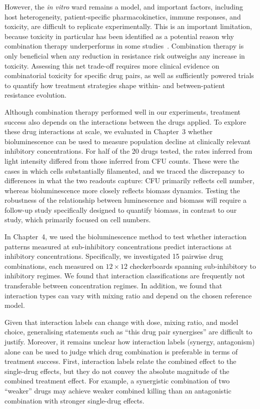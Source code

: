 \documentclass[../main.tex]{subfiles}
\begin{document}
However, the  \textit{in vitro}  ward remains a model, and important factors, including host heterogeneity, patient-specific pharmacokinetics, immune responses, and toxicity, are difficult to replicate experimentally.
This is an important limitation, because toxicity in particular has been identified as a potential reason why combination therapy underperforms in some studies~\cite{Paul2014}.
Combination therapy is only beneficial when any reduction in resistance risk outweighs any increase in toxicity.
Assessing this net trade-off requires more clinical evidence on combinatorial toxicity for specific drug pairs, as well as sufficiently powered trials to quantify how treatment strategies shape within- and between-patient resistance evolution.

Although combination therapy performed well in our experiments, treatment success also depends on the interactions between the drugs applied.
To explore these drug interactions at scale, we evaluated in Chapter~3 whether bioluminescence can be used to measure population decline at clinically relevant inhibitory concentrations.
For half of the 20 drugs tested, the rates inferred from light intensity differed from those inferred from CFU counts.
These were the cases in which cells substantially filamented, and we traced the discrepancy to differences in what the two readouts capture: CFU primarily reflects cell number, whereas bioluminescence more closely reflects biomass dynamics.
Testing the robustness of the relationship between luminescence and biomass will require a follow-up study specifically designed to quantify biomass, in contrast to our study, which primarily focused on cell numbers.

In Chapter~4, we  used the bioluminescence method to test whether interaction patterns measured at sub-inhibitory concentrations predict interactions at inhibitory concentrations.
Specifically, we investigated 15 pairwise drug combinations, each measured on \(12\times 12\) checkerboards spanning sub-inhibitory to inhibitory regimes.
We found that interaction classifications are frequently not transferable between concentration regimes.
In addition, we found that interaction types can vary with mixing ratio and depend on the chosen reference model.

Given that interaction labels can change with dose, mixing ratio, and model choice, generalising statements such as ``this drug pair synergises'' are difficult to justify.
Moreover, it remains unclear how interaction labels (synergy, antagonism) alone can be used to judge which drug combination is preferable in terms of treatment success.
First, interaction labels relate the combined effect to the single-drug effects, but they do not convey the absolute magnitude of the combined treatment effect.
For example, a synergistic combination of two ``weaker'' drugs may achieve weaker combined killing than an antagonistic combination with stronger single-drug effects.
\end{document}
